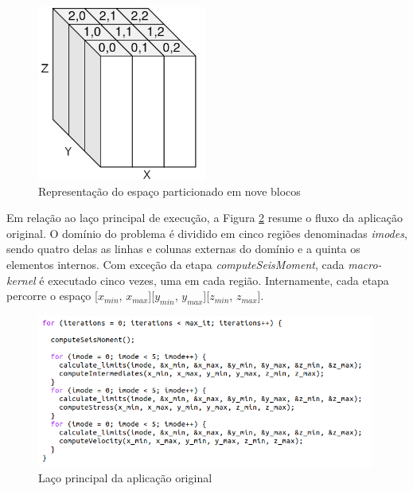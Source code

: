 \documentclass[cic,tc]{iiufrgs}
\begin{document}
\begin{figure}[!htb]
    \caption{Representação do espaço particionado em nove blocos}
    \begin{center}
      \includegraphics[width=15em]{cuboids}
    \end{center}
    \label{fig:cuboids}
\end{figure}

Em relação ao laço principal de execução, a Figura \ref{fig:main_loop} resume o fluxo da aplicação original. O domínio do problema é dividido em cinco regiões denominadas \textit{imodes},
sendo quatro delas as linhas e colunas externas do domínio e a quinta os elementos internos. Com exceção da etapa \textit{computeSeisMoment}, cada \textit{macro-kernel} é executado cinco
vezes, uma em cada região. Internamente, cada etapa percorre o espaço [$x_{min}$, $x_{max}$][$y_{min}$, $y_{max}$][$z_{min}$, $z_{max}$].

\begin{figure}[!htb]
    \caption{Laço principal da aplicação original}
    \begin{center}
      \includegraphics[width=30em]{main_loop}
    \end{center}
    \label{fig:main_loop}
\end{figure}
\end{document}
